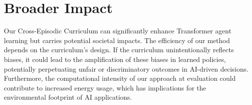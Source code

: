\section{Broader Impact}
\label{supp:sec:broader_impact}


Our Cross-Episodic Curriculum can significantly enhance Transformer agent learning but carries potential societal impacts. 
The efficiency of our method depends on the curriculum's design. If the curriculum unintentionally reflects biases, it could lead to the amplification of these biases in learned policies, potentially perpetuating unfair or discriminatory outcomes in AI-driven decisions.
Furthermore, the computational intensity of our approach at evaluation could contribute to increased energy usage, which has implications for the environmental footprint of AI applications.